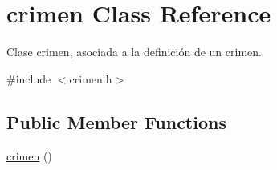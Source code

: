 \hypertarget{classcrimen}{\section{crimen Class Reference}
\label{classcrimen}
}


Clase crimen, asociada a la definición de un crimen.  




{\ttfamily \#include $<$crimen.\-h$>$}

\subsection*{Public Member Functions}
\begin{DoxyCompactItemize}
\item 
\hypertarget{classcrimen_ab1147e36869c7e635699e4ef746a7555}{\hyperlink{classcrimen_ab1147e36869c7e635699e4ef746a7555}{crimen} ()}\label{classcrimen_ab1147e36869c7e635699e4ef746a7555}


\end{DoxyCompactItemize}
